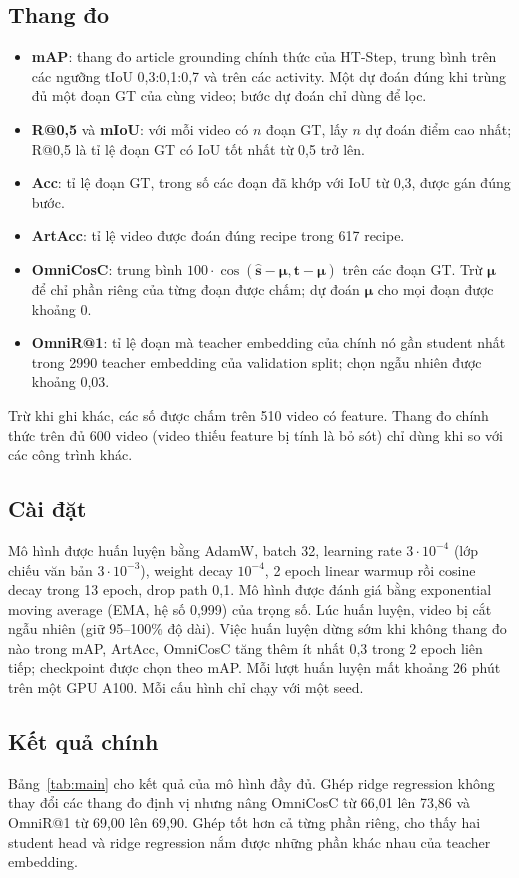 \documentclass{IEEEtran}
\begin{document}
\subsection{Thang đo}
\begin{itemize}
\item \textbf{mAP}: thang đo article grounding chính thức của HT-Step, trung bình trên các ngưỡng tIoU 0,3:0,1:0,7 và trên các activity. Một dự đoán đúng khi trùng đủ một đoạn GT của cùng video; bước dự đoán chỉ dùng để lọc.
\item \textbf{R@0,5} và \textbf{mIoU}: với mỗi video có $n$ đoạn GT, lấy $n$ dự đoán điểm cao nhất; R@0,5 là tỉ lệ đoạn GT có IoU tốt nhất từ 0,5 trở lên.
\item \textbf{Acc}: tỉ lệ đoạn GT, trong số các đoạn đã khớp với IoU từ 0,3, được gán đúng bước.
\item \textbf{ArtAcc}: tỉ lệ video được đoán đúng recipe trong 617 recipe.
\item \textbf{OmniCosC}: trung bình $100 \cdot \cos(\hat{\mathbf{s}} - \boldsymbol{\mu}, \mathbf{t} - \boldsymbol{\mu})$ trên các đoạn GT. Trừ $\boldsymbol{\mu}$ để chỉ phần riêng của từng đoạn được chấm; dự đoán $\boldsymbol{\mu}$ cho mọi đoạn được khoảng 0.
\item \textbf{OmniR@1}: tỉ lệ đoạn mà teacher embedding của chính nó gần student nhất trong 2990 teacher embedding của validation split; chọn ngẫu nhiên được khoảng 0,03.
\end{itemize}
Trừ khi ghi khác, các số được chấm trên 510 video có feature. Thang đo chính thức trên đủ 600 video (video thiếu feature bị tính là bỏ sót) chỉ dùng khi so với các công trình khác.

\subsection{Cài đặt}
Mô hình được huấn luyện bằng AdamW, batch 32, learning rate $3 \cdot 10^{-4}$ (lớp chiếu văn bản $3 \cdot 10^{-3}$), weight decay $10^{-4}$, 2 epoch linear warmup rồi cosine decay trong 13 epoch, drop path 0,1. Mô hình được đánh giá bằng exponential moving average (EMA, hệ số 0,999) của trọng số. Lúc huấn luyện, video bị cắt ngẫu nhiên (giữ 95--100\% độ dài). Việc huấn luyện dừng sớm khi không thang đo nào trong mAP, ArtAcc, OmniCosC tăng thêm ít nhất 0,3 trong 2 epoch liên tiếp; checkpoint được chọn theo mAP. Mỗi lượt huấn luyện mất khoảng 26 phút trên một GPU A100. Mỗi cấu hình chỉ chạy với một seed.

\subsection{Kết quả chính}
Bảng~\ref{tab:main} cho kết quả của mô hình đầy đủ. Ghép ridge regression không thay đổi các thang đo định vị nhưng nâng OmniCosC từ 66,01 lên 73,86 và OmniR@1 từ 69,00 lên 69,90. Ghép tốt hơn cả từng phần riêng, cho thấy hai student head và ridge regression nắm được những phần khác nhau của teacher embedding.
\end{document}
